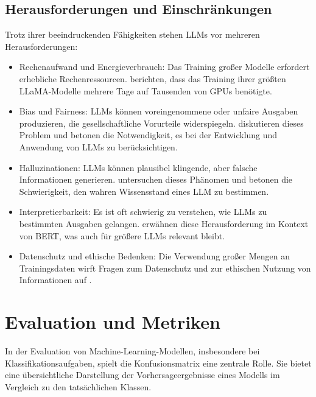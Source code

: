 \subsection{Herausforderungen und Einschränkungen}
\label{subsec:llm-challenges}

Trotz ihrer beeindruckenden Fähigkeiten stehen \glspl{LLM} vor mehreren Herausforderungen:

\begin{itemize}
	\item Rechenaufwand und Energieverbrauch: Das Training großer Modelle erfordert erhebliche Rechenressourcen. \textcite{TouvronHugo2023LOaE} berichten, dass das Training ihrer größten LLaMA-Modelle mehrere Tage auf Tausenden von GPUs benötigte.
	\item Bias und Fairness: \glspl{LLM} können voreingenommene oder unfaire Ausgaben produzieren, die gesellschaftliche Vorurteile widerspiegeln. \textcite{BrownTomB2020LMaF} diskutieren dieses Problem und betonen die Notwendigkeit, es bei der Entwicklung und Anwendung von \glspl{LLM} zu berücksichtigen.
	\item Halluzinationen: \glspl{LLM} können plausibel klingende, aber falsche Informationen generieren. \textcite{JiangZhengbao2020HCWK} untersuchen dieses Phänomen und betonen die Schwierigkeit, den wahren Wissensstand eines \gls{LLM} zu bestimmen.
	\item Interpretierbarkeit: Es ist oft schwierig zu verstehen, wie \glspl{LLM} zu bestimmten Ausgaben gelangen. \textcite{DevlinJacob2019BPoD} erwähnen diese Herausforderung im Kontext von BERT, was auch für größere \glspl{LLM} relevant bleibt.
	\item Datenschutz und ethische Bedenken: Die Verwendung großer Mengen an Trainingsdaten wirft Fragen zum Datenschutz und zur ethischen Nutzung von Informationen auf \parencite{TouvronHugo2023LOaE}.
\end{itemize}

\section{Evaluation und Metriken}
\label{sec:evaluation-metrics}

In der Evaluation von Machine-Learning-Modellen, insbesondere bei Klassifikationsaufgaben, spielt die Konfusionsmatrix eine zentrale Rolle. Sie bietet eine übersichtliche Darstellung der Vorhersageergebnisse eines Modells im Vergleich zu den tatsächlichen Klassen.

